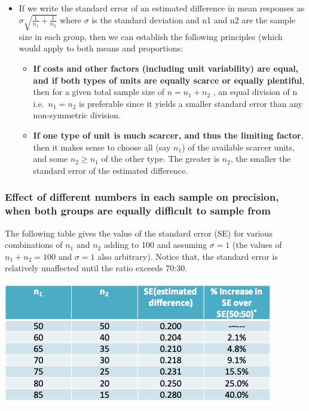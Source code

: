 \documentclass[
]{book}
\providecommand{\tightlist}{%
  \setlength{\itemsep}{0pt}\setlength{\parskip}{0pt}}
\begin{document}
\begin{itemize}
\tightlist
\item
  If we write the standard error of an estimated difference in mean responses as \(\sigma\sqrt{\frac{1}{n_1}+\frac{1}{n_2}}\) where \(\sigma\) is the standard deviation and n1 and n2 are the sample size in each group, then we can establish the following principles (which would apply to both means and proportions:

  \begin{itemize}
  \tightlist
  \item
    \textbf{If costs and other factors (including unit variability) are equal, and if both types of units are equally scarce or equally plentiful}, then for a given total sample size of \(n = n_1 + n_2\) , an equal division of n i.e.~\(n_1 = n_2\) is preferable since it yields a smaller standard error than any non-symmetric division.
  \item
    \textbf{If one type of unit is much scarcer, and thus the limiting factor}, then it makes sense to choose all (say \(n_1\)) of the available scarcer units, and some \(n_2 \geq n_1\) of the other type. The greater is \(n_2\), the smaller the standard error of the estimated difference.
  \end{itemize}
\end{itemize}

\hypertarget{effect-of-different-numbers-in-each-sample-on-precision-when-both-groups-are-equally-difficult-to-sample-from}{%
\subsubsection{Effect of different numbers in each sample on precision, when both groups are equally difficult to sample from}\label{effect-of-different-numbers-in-each-sample-on-precision-when-both-groups-are-equally-difficult-to-sample-from}}

The following table gives the value of the standard error (SE) for various combinations of \(n_1\) and \(n_2\) adding to 100 and assuming \(\sigma = 1\) (the values of \(n_1 + n_2 =100\) and \(\sigma = 1\) also arbitrary). Notice that, the standard error is relatively unaffected until the ratio exceeds 70:30.

\includegraphics[width=0.5\linewidth]{./4_75}
\end{document}
